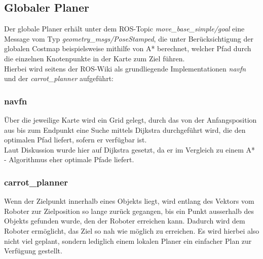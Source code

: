 \documentclass[oribibl]{llncs}
\begin{document}
\subsection{Globaler Planer}
Der globale Planer erhält unter dem ROS-Topic \textit{move\_base\_simple/goal} eine Message vom Typ \textit{geometry\_msgs/PoseStamped}, die unter Berücksichtigung der globalen Costmap beispielsweise mithilfe von A* berechnet, welcher Pfad durch die einzelnen Knotenpunkte in der Karte zum Ziel führen.\\
Hierbei wird seitens der ROS-Wiki als grundliegende Implementationen \textit{navfn} und der \textit{carrot\_planner} aufgeführt:
\subsubsection{navfn}
Über die jeweilige Karte wird ein Grid gelegt, durch das von der Anfangsposition aus bis zum Endpunkt eine Suche mittels Dijkstra durchgeführt wird, die den optimalen Pfad liefert, sofern er verfügbar ist.\\
Laut Diskussion wurde hier auf Dijkstra gesetzt, da er im Vergleich zu einem A* - Algorithmus eher optimale Pfade liefert. \cite{navfn}
\subsubsection{carrot\_planner}
Wenn der Zielpunkt innerhalb eines Objekts liegt, wird entlang des Vektors vom Roboter zur Zielposition so lange zurück gegangen, bis ein Punkt ausserhalb des Objekts gefunden wurde, den der Roboter erreichen kann. Dadurch wird dem Roboter ermöglicht, das Ziel so nah wie möglich zu erreichen. Es wird hierbei also nicht viel geplant, sondern lediglich einem lokalen Planer ein einfacher Plan zur Verfügung gestellt. \cite{carrotPlanner}
\end{document}
